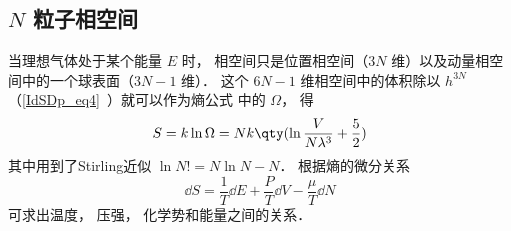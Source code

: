 
\begin{issues}
\issueDraft
\end{issues}

\subsection{$N$ 粒子相空间}

当理想气体处于某个能量 $E$ 时， 相空间只是位置相空间（$3N$ 维）以及动量相空间中的一个球表面（$3N-1$ 维）． 这个 $6N - 1$ 维相空间中的体积除以 $h^{3N}$ （\autoref{IdSDp_eq4}~）就可以作为熵公式%
中的 $\Omega$， 得
\begin{equation}
S = k\ln \Omega  = Nk \qty(\ln \frac{V}{N\lambda^3} + \frac52)
\end{equation}
其中用到了Stirling近似%
$\ln N! = N\ln N - N$． 根据熵的微分关系
\begin{equation}
\dd{S} = \frac{1}{T} \dd{E} + \frac{P}{T} \dd{V} - \frac{\mu}{T} \dd{N}
\end{equation}
可求出温度， 压强， 化学势和能量之间的关系．

